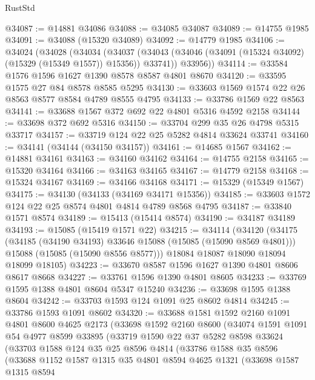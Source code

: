 \begin{lexlean}{RustStd}
\begin{coremodule}
@34087 := @14881 @34086
@34088 := @34085 @34087
@34089 := @14755 @1985
@34091 := @34088 (@15320 @34089)
@34092 := @14779 @1985
@34106 := @34024
    (@34028
      (@34034
        (@34037 (@34043 (@34046 (@34091 (@15324 @34092) (@15329 (@15349 @1557)) @15356)) @33741))
        @33956))
@34114 := @33584 @1576 @1596 @1627 @1390 @8578 @8587 @4801 @8670
@34120 := @33595 @1575 @27 @84 @8578 @8585 @5295
@34130 := @33603 @1569 @1574 @22 @26 @8563 @8577 @8584 @4789 @8555 @4795
@34133 := @33786 @1569 @22 @8563
@34141 := @33688 @1567 @372 @692 @22 @4801 @5316 @4592 @2158
@34144 := @33698 @372 @692 @5316
@34150 := @33704 @299 @35 @26 @4798 @5315 @33717
@34157 := @33719 @124 @22 @25 @5282 @4814 @33624 @33741
@34160 := @34141 (@34144 (@34150 @34157))
@34161 := @14685 @1567
@34162 := @14881 @34161
@34163 := @34160 @34162
@34164 := @14755 @2158
@34165 := @15320 @34164
@34166 := @34163 @34165
@34167 := @14779 @2158
@34168 := @15324 @34167
@34169 := @34166 @34168
@34171 := @15329 (@15349 @1567)
@34175 := @34130 (@34133 (@34169 @34171 @15356))
@34185 := @33603 @1572 @124 @22 @25 @8574 @4801 @4814 @4789 @8568 @4795
@34187 := @33840 @1571 @8574
@34189 := @15413 (@15414 @8574)
@34190 := @34187 @34189
@34193 := @15085 (@15419 @1571 @22)
@34215 := @34114
    (@34120
      (@34175
        (@34185 (@34190 @34193) @33646 @15088 (@15085 (@15090 @8569 @4801)))
        @15088
        (@15085 (@15090 @8556 @8577)))
      @18084
      @18087
      @18090
      @18094
      @18099
      @18105)
@34223 := @33670 @8587 @1596 @1627 @1390 @4801 @8606 @8617 @8668
@34227 := @33761 @1596 @1390 @4801 @8605
@34233 := @33769 @1595 @1388 @4801 @8604 @5347 @15240
@34236 := @33698 @1595 @1388 @8604
@34242 := @33703 @1593 @124 @1091 @25 @8602 @4814
@34245 := @33786 @1593 @1091 @8602
@34320 := @33688
    @1581
    @1592
    @2160
    @1091
    @4801
    @8600
    @4625
    @2173
    (@33698
      @1592
      @2160
      @8600
      (@34074
        @1591
        @1091
        @54
        @4977
        @8599
        @33895
        (@33719
          @1590
          @22
          @37
          @5282
          @8598
          @33624
          (@33703
            @1588
            @124
            @35
            @25
            @8596
            @4814
            (@33786
              @1588
              @35
              @8596
              (@33688
                @1152
                @1587
                @1315
                @35
                @4801
                @8594
                @4625
                @1321
                (@33698
                  @1587
                  @1315
                  @8594

\end{coremodule}
\end{lexlean}
